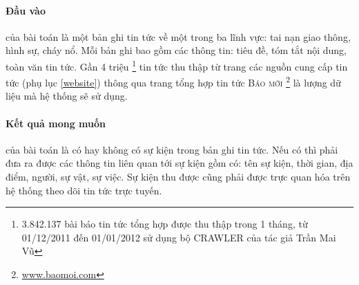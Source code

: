\paragraph{Đầu vào} của bài toán là một bản ghi tin tức về một trong  ba lĩnh vực: tai nạn giao thông, hình sự, cháy nổ. Mỗi bản ghi bao gồm các thông tin: tiêu đề, tóm tắt nội dung, toàn văn tin tức. Gần 4 triệu \footnote{3.842.137 bài báo tin tức tổng hợp được thu thập trong 1 tháng, từ 01/12/2011 đến 01/01/2012 sử dụng bộ CRAWLER của tác giả Trần Mai Vũ} tin tức thu thập từ trang các nguồn cung cấp tin tức (phụ lục \ref{website}) thông qua trang tổng hợp tin tức \textsc{Báo mới} \footnote{\href{www.baomoi.com}{www.baomoi.com}} là lượng dữ liệu mà hệ thống sẽ sử dụng.

\paragraph{Kết quả mong muốn} của bài toán là có hay không có sự kiện trong bản ghi tin tức. Nếu có thì phải đưa ra được các thông tin liên quan tới sự kiện gồm có: tên sự kiện, thời gian, địa điểm, người, sự vật, sự việc. Sự kiện thu được cũng phải được trực quan hóa trên hệ thống theo dõi tin tức trực tuyến.
